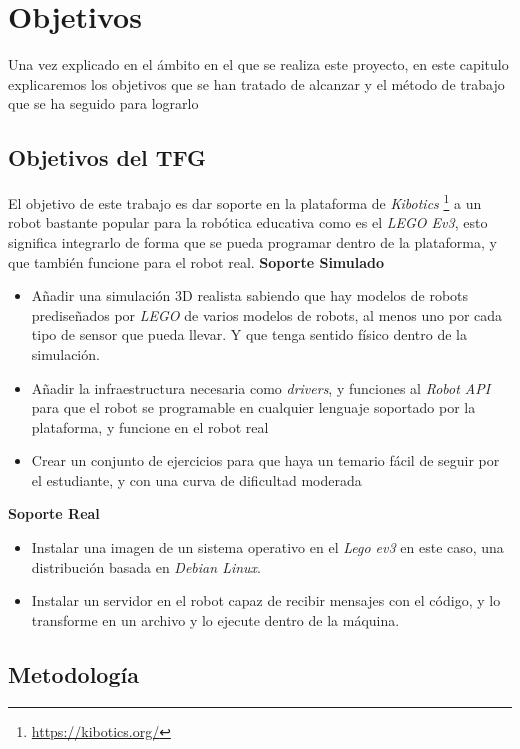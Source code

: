 \chapter{Objetivos}\label{chap:objetivos}
Una vez explicado en el ámbito en el que se realiza este proyecto, en este capitulo explicaremos los objetivos que se han tratado de alcanzar y el método de trabajo que se ha seguido para lograrlo

\section{Objetivos del TFG}
El objetivo de este trabajo es dar soporte en la plataforma de \textit{Kibotics} \footnote{\url{https://kibotics.org/}} a un robot bastante popular para la robótica educativa como es el \textit{LEGO Ev3}, esto significa integrarlo de forma que se pueda programar dentro de la plataforma, y que también funcione para el robot real.\newline 
\textbf{Soporte Simulado}
\begin{itemize}
    \item Añadir una simulación 3D realista sabiendo que hay modelos de robots prediseñados por \textit{LEGO} de varios modelos de robots, al menos uno por cada tipo de sensor que pueda llevar. Y que tenga sentido físico dentro de la simulación.
        
    \item Añadir la infraestructura necesaria como \textit{drivers}, y funciones al \textit{Robot API} para que el robot se programable en cualquier lenguaje soportado por la plataforma, y funcione en el robot real
    
    \item Crear un conjunto de ejercicios para que haya un temario fácil de seguir por el estudiante, y con una curva de dificultad moderada
    
\end{itemize}
\textbf{Soporte Real}
\begin{itemize}
    \item Instalar una imagen de un sistema operativo en el \textit{Lego ev3} en este caso, una distribución basada en \textit{Debian Linux}.
    \item Instalar un servidor en el robot capaz de recibir mensajes con el código, y lo transforme en un archivo y lo ejecute dentro de la máquina.
    
\end{itemize}
\section{Metodología}
\label{sec:metodologia}

